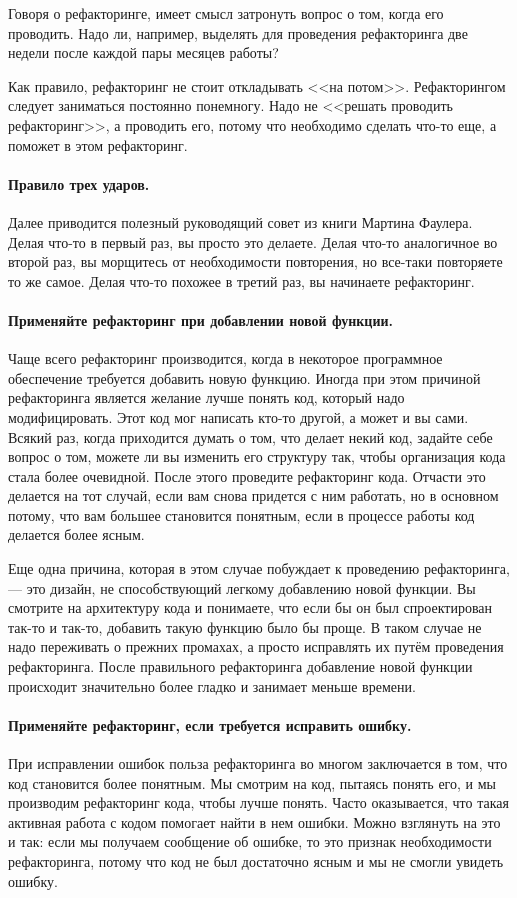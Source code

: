 \documentclass{../../text-style}
\begin{document}
Говоря о рефакторинге, имеет смысл затронуть вопрос о том, когда его проводить. Надо ли, например, выделять для проведения рефакторинга две недели после каждой пары месяцев работы?

Как правило, рефакторинг не стоит откладывать <<на потом>>. Рефакторингом следует заниматься постоянно понемногу. Надо не <<решать проводить рефакторинг>>, а проводить его, потому что необходимо сделать что-то еще, а поможет в этом рефакторинг.

\paragraph{Правило трех ударов.} Далее приводится полезный руководящий совет из книги Мартина Фаулера. Делая что-то в первый раз, вы просто это делаете. Делая что-то аналогичное во второй раз, вы морщитесь от необходимости повторения, но все-таки повторяете то же самое. Делая что-то похожее в третий раз, вы начинаете рефакторинг.

\paragraph{Применяйте рефакторинг при добавлении новой функции.} Чаще всего рефакторинг производится, когда в некоторое программное обеспечение требуется добавить новую функцию. Иногда при этом причиной рефакторинга является желание лучше понять код, который надо модифицировать. Этот код мог написать кто-то другой, а может и вы сами. Всякий раз, когда приходится думать о том, что делает некий код, задайте себе вопрос о том, можете ли вы изменить его структуру так, чтобы организация кода стала более очевидной. После этого проведите рефакторинг кода. Отчасти это делается на тот случай, если вам снова придется с ним работать, но в основном потому, что вам большее становится понятным, если в процессе работы код делается более ясным.

Еще одна причина, которая в этом случае побуждает к проведению рефакторинга, --- это дизайн, не способствующий легкому добавлению новой функции. Вы смотрите на архитектуру кода и понимаете, что если бы он был спроектирован так-то и так-то, добавить такую функцию было бы проще. В таком случае не надо переживать о прежних промахах, а просто исправлять их путём проведения рефакторинга. После правильного рефакторинга добавление новой функции происходит значительно более гладко и занимает меньше времени.

\paragraph{Применяйте рефакторинг, если требуется исправить ошибку.} При исправлении ошибок польза рефакторинга во многом заключается в том, что код становится более понятным. Мы смотрим на код, пытаясь понять его, и мы производим рефакторинг кода, чтобы лучше понять. Часто оказывается, что такая активная работа с кодом помогает найти в нем ошибки. Можно взглянуть на это и так: если мы получаем сообщение об ошибке, то это признак необходимости рефакторинга, потому что код не был достаточно ясным и мы не смогли увидеть ошибку.
\end{document}

